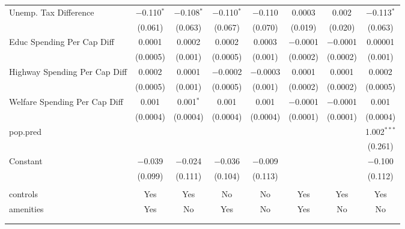 \begin{table}[!htbp]
\begin{tabular}{@{\extracolsep{5pt}}lccccccc}
  Unemp. Tax Difference & $-$0.110$^{*}$ & $-$0.108$^{*}$ & $-$0.110$^{*}$ & $-$0.110 & 0.0003 & 0.002 & $-$0.113$^{*}$ \\ 
  & (0.061) & (0.063) & (0.067) & (0.070) & (0.019) & (0.020) & (0.063) \\ 
  Educ Spending Per Cap Diff & 0.0001 & 0.0002 & 0.0002 & 0.0003 & $-$0.0001 & $-$0.0001 & 0.00001 \\ 
  & (0.0005) & (0.001) & (0.0005) & (0.001) & (0.0002) & (0.0002) & (0.001) \\ 
  Highway Spending Per Cap Diff & 0.0002 & 0.0001 & $-$0.0002 & $-$0.0003 & 0.0001 & 0.0001 & 0.0002 \\ 
  & (0.0005) & (0.001) & (0.0005) & (0.001) & (0.0002) & (0.0002) & (0.0005) \\ 
  Welfare Spending Per Cap Diff & 0.001 & 0.001$^{*}$ & 0.001 & 0.001 & $-$0.0001 & $-$0.0001 & 0.001 \\ 
  & (0.0004) & (0.0004) & (0.0004) & (0.0004) & (0.0001) & (0.0001) & (0.0004) \\ 
  pop.pred &  &  &  &  &  &  & 1.002$^{***}$ \\ 
  &  &  &  &  &  &  & (0.261) \\ 
  Constant & $-$0.039 & $-$0.024 & $-$0.036 & $-$0.009 &  &  & $-$0.100 \\ 
  & (0.099) & (0.111) & (0.104) & (0.113) &  &  & (0.112) \\ 
 \hline \\[-1.8ex] 
controls & Yes & Yes & No & No & Yes & Yes & Yes \\ 
amenities & Yes & No & Yes & No & Yes & No & No \\ 
\hline \\[-1.8ex] 
\hline 
\hline \\[-1.8ex] 
\end{tabular} 
\end{table} 
